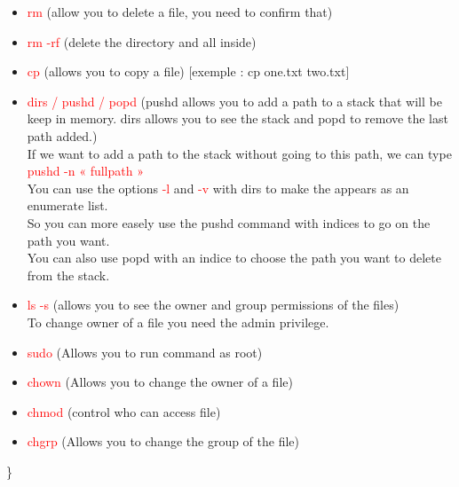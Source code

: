 \documentclass{article}
\begin{document}
\begin{itemize}
    \item \textcolor{red}{rm} (allow you to delete a file, you need to confirm that) \\
    \item \textcolor{red}{rm -rf} (delete the directory and all inside) \\
    \item \textcolor{red}{cp} (allows you to copy a file) [exemple : cp one.txt two.txt] \\
    \item \textcolor{red}{dirs / pushd / popd} (pushd allows you to add a path to a stack that will be keep in memory. dirs allows you to see the stack and popd to remove the last path added.) \\
    If we want to add a path to the stack without going to this path, we can type \textcolor{red}{pushd -n « fullpath »} \\
    You can use the options \textcolor{red}{-l} and \textcolor{red}{-v} with dirs to make the appears as an enumerate list. \\
    So you can more easely use the pushd command with indices to go on the path you want. \\
    You can also use popd with an indice to choose the path you want to delete from the stack. \\
    \item \textcolor{red}{ls -s} (allows you to see the owner and group permissions of the files) \\
    To change owner of a file you need the admin privilege. \\
    \item \textcolor{red}{sudo} (Allows you to run command as root) \\
\end{itemize}
\begin{minipage}[c]{0.5\textwidth}
    \begin{itemize}
        \item \textcolor{red}{chown} (Allows you to change the owner of a file) \\
        \item \textcolor{red}{chmod} (control who can access file) \\
        \item \textcolor{red}{chgrp} (Allows you to change the group of the file)
    \end{itemize}
\end{minipage}
\begin{minipage}[c]{0.05\textwidth}
    \Bigg \}
\end{minipage}
\end{document}
